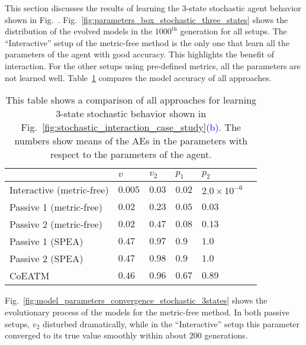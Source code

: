 This section discusses the results of learning the 3-state stochastic agent behavior shown in Fig.~. Fig.~\ref{fig:parameters_box_stochastic_three_states} shows the distribution of the evolved models in the $1000^\mathrm{th}$ generation for all setups. The ``Interactive'' setup of the metric-free method is the only one that learn all the parameters of the agent with good accuracy. This highlights the benefit of interaction. For the other setups using pre-defined metrics, all the parameters are not learned well. Table~\ref{table:relative_accuracy_stochastic_3states} compares the model accuracy of all approaches.

\begin{table}[!t] 
\caption{This table shows a comparison of all approaches for learning 3-state stochastic behavior shown in Fig.~\ref{fig:stochastic_interaction_case_study}\textcolor{blue}{(b)}. The numbers show means of the AEs in the parameters with respect to the parameters of the agent.} 
\renewcommand{\arraystretch}{1.1}
\centering %
\begin{tabular}{l l l l l l} %
\hline\hline  %
 & $v$ & $v_2$ & $p_1$ & $p_2$ &  \\  
\hline   %
Interactive (metric-free) & $0.005$ & $0.03$ & $0.02$ & $2.0\times10^{-6}$ \\ %
Passive 1 (metric-free) & $0.02$ & $0.23$ & $0.05$ & $0.03$\\ 
Passive 2 (metric-free) & $0.02$ & $0.47$ & $0.08$ & $0.13$\\ 
Passive 1 (SPEA) & $0.47$ & $0.97$ & $0.9$ & $1.0$\\ 
Passive 2 (SPEA) & $0.47$ & $0.98$ & $0.9$ & $1.0$\\ 
CoEATM & $0.46$ & $0.96$ & $0.67$ & $0.89$\\
\hline %
\end{tabular} 
\label{table:relative_accuracy_stochastic_3states} 
\end{table} 

Fig.~\ref{fig:model_parameters_convergence_stochastic_3states} shows the evolutionary process of the models for the metric-free method. In both passive setups, $v_2$ disturbed dramatically, while in the ``Interactive'' setup this parameter converged to its true value smoothly within about $200$ generations.

